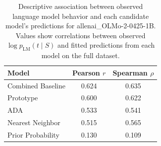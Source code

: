 \begin{table}

\caption{\label{tab:tab:model-correlations}Descriptive association between observed language model behavior and each candidate model's predictions for allenai_OLMo-2-0425-1B. Values show correlations between observed $\log p_{\mathrm{LM}}(t \mid S)$ and fitted predictions from each model on the full dataset.}
\centering
\begin{tabular}[t]{lcc}
\toprule
Model & Pearson $r$ & Spearman $\rho$\\
\midrule
Combined Baseline & 0.624 & 0.635\\
Prototype & 0.600 & 0.622\\
ADA & 0.533 & 0.541\\
Nearest Neighbor & 0.515 & 0.565\\
Prior Probability & 0.130 & 0.109\\
\bottomrule
\end{tabular}
\end{table}
